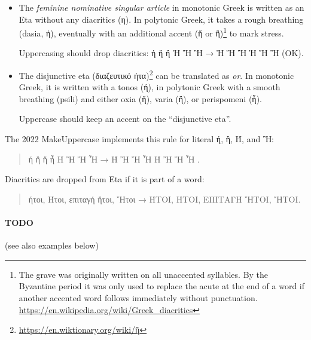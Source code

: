 \documentclass[a4paper]{article}
\newcommand*{\Greek}{\foreignlanguage{greek}}
\newcommand*{\Greek}{\ensuregreek}
\newcommand*{\TestUppercase}[1]{\Greek{#1 → \MakeUppercase{#1}}}
\begin{document}
\begin{itemize}
\item The \emph{feminine nominative singular article} in monotonic Greek is
  written as an Eta without any diacritics (η).
  In polytonic Greek, it takes a rough breathing (dasia, ἡ),
  eventually with an additional accent (ἥ or ἣ)\footnote{
    \label{foot:varia}
    The grave was originally written on all unaccented syllables.
    By the Byzantine period it was only used to replace the acute
    at the end of a word if another accented word follows immediately
    without punctuation.
    \url{https://en.wikipedia.org/wiki/Greek_diacritics}
  }
  to mark stress.

  Uppercasing should drop diacritics: \TestUppercase{ ἡ ἥ ἣ Ἡ Ἥ Ἣ } (OK).

\item The disjunctive eta (διαζευτικό ήτα)\footnote{
    \href{https://en.wiktionary.org/wiki/\%E1\%BC\%A4}
         {https://en.wiktionary.org/wiki/ἤ}}
  can be translated as \emph{or}.
  In monotonic Greek, it is written with a tonos (ή), in
  polytonic Greek with a smooth breathing (psili) and either oxia (ἤ),
  varia (ἢ), or perispomeni (ἦ).

  Uppercase should keep an accent on the ``disjunctive eta''.

\end{itemize}
%
The 2022 MakeUppercase implements this rule for literal ή, ἢ, Ή, and Ἢ:
\begin{quotation}
  \TestUppercase{ ή ἢ ἤ ἦ Ή Ἢ Ἤ Ἦ }.
\end{quotation}
%
Diacritics are dropped from Eta if it is part of a word:
\begin{quotation}
  \TestUppercase{ήτοι, Ήτοι, επιταγή ἤτοι, Ἤτοι}.
\end{quotation}

\paragraph{TODO} (see also examples below)
\end{document}
